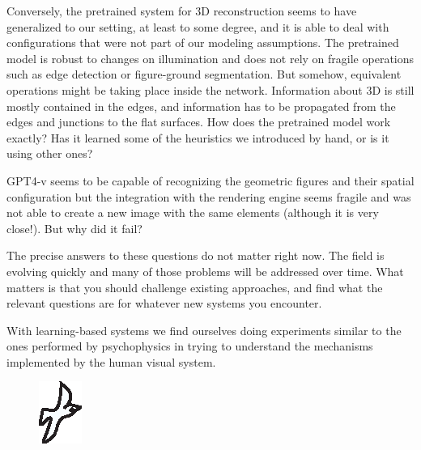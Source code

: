 Conversely, the pretrained system for 3D reconstruction seems to have generalized to our setting, at least to some degree, and it is able to deal with configurations that were not part of our modeling assumptions. The pretrained model is robust to changes on illumination and does not rely on fragile operations such as edge detection or figure-ground segmentation. But somehow, equivalent operations might be taking place inside the network. Information about 3D is still mostly contained in the edges, and information has to be propagated from the edges and junctions to the flat surfaces. How does the pretrained model work exactly? Has it learned some of the heuristics we introduced by hand, or is it using other ones?

GPT4-v seems to be capable of recognizing the geometric figures and their spatial configuration but the integration with the rendering engine seems fragile and was not able to create a new image with the same elements (although it is very close!). But why did it fail?

The precise answers to these questions do not matter right now. The field is evolving quickly and many of those problems will be addressed over time. What matters is that you should challenge existing approaches, and find what the relevant questions are for whatever new systems you encounter.

With learning-based systems we find ourselves doing experiments similar to the ones performed by psychophysics in trying to understand the mechanisms implemented by the human visual system.

\begin{figure}
    \centerline{
        \includegraphics[width=.06\linewidth]{figures/simplesystem_revisited/gibson_bird.eps}
    }
\end{figure}


